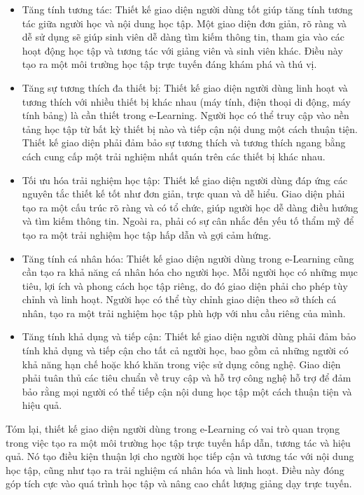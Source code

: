 \documentclass[../Thesis.tex]{subfiles}
\begin{document}
	\begin{itemize}
		\item Tăng tính tương tác: Thiết kế giao diện người dùng tốt giúp tăng tính tương tác giữa người học và nội dung học tập. Một giao diện đơn giản, rõ ràng và dễ sử dụng sẽ giúp sinh viên dễ dàng tìm kiếm thông tin, tham gia vào các hoạt động học tập và tương tác với giảng viên và sinh viên khác. Điều này tạo ra một môi trường học tập trực tuyến đáng khám phá và thú vị.

		\item Tăng sự tương thích đa thiết bị: Thiết kế giao diện người dùng linh hoạt và tương thích với nhiều thiết bị khác nhau (máy tính, điện thoại di động, máy tính bảng) là cần thiết trong e-Learning. Người học có thể truy cập vào nền tảng học tập từ bất kỳ thiết bị nào và tiếp cận nội dung một cách thuận tiện. Thiết kế giao diện phải đảm bảo sự tương thích và tương thích ngang bằng cách cung cấp một trải nghiệm nhất quán trên các thiết bị khác nhau.

		\item Tối ưu hóa trải nghiệm học tập: Thiết kế giao diện người dùng đáp ứng các nguyên tắc thiết kế tốt như đơn giản, trực quan và dễ hiểu. Giao diện phải tạo ra một cấu trúc rõ ràng và có tổ chức, giúp người học dễ dàng điều hướng và tìm kiếm thông tin. Ngoài ra, phải có sự cân nhắc đến yếu tố thẩm mỹ để tạo ra một trải nghiệm học tập hấp dẫn và gợi cảm hứng.

		\item Tăng tính cá nhân hóa: Thiết kế giao diện người dùng trong e-Learning cũng cần tạo ra khả năng cá nhân hóa cho người học. Mỗi người học có những mục tiêu, lợi ích và phong cách học tập riêng, do đó giao diện phải cho phép tùy chỉnh và linh hoạt. Người học có thể tùy chỉnh giao diện theo sở thích cá nhân, tạo ra một trải nghiệm học tập phù hợp với nhu cầu riêng của mình.

		\item Tăng tính khả dụng và tiếp cận: Thiết kế giao diện người dùng phải đảm bảo tính khả dụng và tiếp cận cho tất cả người học, bao gồm cả những người có khả năng hạn chế hoặc khó khăn trong việc sử dụng công nghệ. Giao diện phải tuân thủ các tiêu chuẩn về truy cập và hỗ trợ công nghệ hỗ trợ để đảm bảo rằng mọi người có thể tiếp cận nội dung học tập một cách thuận tiện và hiệu quả.
	\end{itemize}
	Tóm lại, thiết kế giao diện người dùng trong e-Learning có vai trò quan trọng trong việc tạo ra một môi trường học tập trực tuyến hấp dẫn, tương tác và hiệu quả. Nó tạo điều kiện thuận lợi cho người học tiếp cận và tương tác với nội dung học tập, cũng như tạo ra trải nghiệm cá nhân hóa và linh hoạt. Điều này đóng góp tích cực vào quá trình học tập và nâng cao chất lượng giảng dạy trực tuyến.
\end{document}
